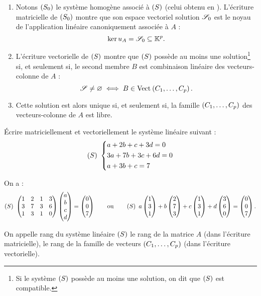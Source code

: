 \begin{rem}
\begin{enumerate}
\item Notons \(\left(S_0\right)\) le système homogène associé à \(\left(S\right)\) (\cad celui obtenu en ). L'écriture matricielle de \(\left(S_0\right)\) montre que son espace vectoriel solution \(\mathscr{S}_0\) est le noyau de l'application linéaire canoniquement associée à \(A\) : \[\ker u_A=\mathscr{S}_0\subseteq\mathbb{K}^p.\]

\item L'écriture vectorielle de \(\left(S\right)\) montre que \(\left(S\right)\) possède au moins une solution\footnote{Si le système \(\left(S\right)\) possède au moins une solution, on dit que \(\left(S\right)\) est compatible.} si, et seulement si, le second membre \(B\) est combinaison linéaire des vecteurs-colonne de \(A\) : \[\fami{S}\not=\ensvide\ssi B\in\Vect{C_1,\dots,C_p}.\]

\item Cette solution est alors unique si, et seulement si, la famille \(\left(C_1,\dots,C_p\right)\) des vecteurs-colonne de \(A\) est libre.
\end{enumerate}
\end{rem}

\begin{exoex}
Écrire matriciellement et vectoriellement le système linéaire suivant : \[\left(S\right)~\begin{dcases}
a+2b+c+3d=0 \\
3a+7b+3c+6d=0 \\
a+3b+c=7
\end{dcases}\]
\end{exoex}

\begin{corr}
On a : \[\left(S\right)~\begin{pmatrix}
1 & 2 & 1 & 3 \\
3 & 7 & 3 & 6 \\
1 & 3 & 1 & 0
\end{pmatrix}\begin{pmatrix}
a \\
b \\
c \\
d
\end{pmatrix}=\begin{pmatrix}0\\0\\7\end{pmatrix}\qquad\text{ou}\qquad\left(S\right)~a\begin{pmatrix}1\\3\\1\end{pmatrix}+b\begin{pmatrix}2\\7\\3\end{pmatrix}+c\begin{pmatrix}1\\3\\1\end{pmatrix}+d\begin{pmatrix}3\\6\\0\end{pmatrix}=\begin{pmatrix}0\\0\\7\end{pmatrix}.\]
\end{corr}

\begin{defi}
On appelle rang du système linéaire \(\left(S\right)\) le rang de la matrice \(A\) (dans l'écriture matricielle), \cad le rang de la famille de vecteurs \(\left(C_1,\dots,C_p\right)\) (dans l'écriture vectorielle).
\end{defi}

